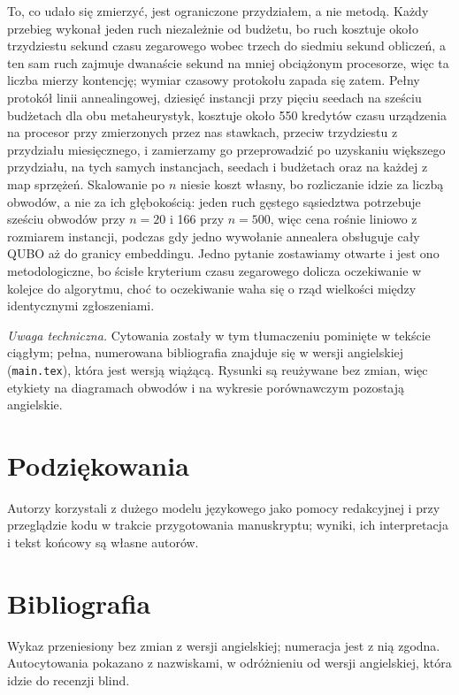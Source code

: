 \documentclass[11pt,a4paper]{article}
\begin{document}
To, co udało się zmierzyć, jest ograniczone przydziałem, a nie metodą. Każdy
przebieg wykonał jeden ruch niezależnie od budżetu, bo ruch kosztuje około
trzydziestu sekund czasu zegarowego wobec trzech do siedmiu sekund obliczeń,
a ten sam ruch zajmuje dwanaście sekund na mniej obciążonym procesorze, więc
ta liczba mierzy kontencję; wymiar czasowy protokołu zapada się zatem. Pełny
protokół linii annealingowej, dziesięć instancji przy pięciu seedach na sześciu
budżetach dla obu metaheurystyk, kosztuje około 550 kredytów czasu urządzenia
na procesor przy zmierzonych przez nas stawkach, przeciw trzydziestu
z przydziału miesięcznego, i zamierzamy go przeprowadzić po uzyskaniu
większego przydziału, na tych samych instancjach, seedach i budżetach oraz na
każdej z map sprzężeń. Skalowanie po $n$ niesie koszt własny, bo rozliczanie
idzie za liczbą obwodów, a nie za ich głębokością: jeden ruch gęstego
sąsiedztwa potrzebuje sześciu obwodów przy $n=20$ i 166 przy $n=500$, więc
cena rośnie liniowo z rozmiarem instancji, podczas gdy jedno wywołanie
annealera obsługuje cały QUBO aż do granicy embeddingu. Jedno pytanie
zostawiamy otwarte i jest ono metodologiczne, bo ścisłe kryterium czasu
zegarowego dolicza oczekiwanie w kolejce do algorytmu, choć to oczekiwanie
waha się o rząd wielkości między identycznymi zgłoszeniami.

\bigskip
\noindent\footnotesize
\emph{Uwaga techniczna.} Cytowania zostały w tym tłumaczeniu pominięte
w tekście ciągłym; pełna, numerowana bibliografia znajduje się w wersji
angielskiej (\texttt{main.tex}), która jest wersją wiążącą. Rysunki są
reużywane bez zmian, więc etykiety na diagramach obwodów i na wykresie
porównawczym pozostają angielskie.


\section*{Podziękowania}
\noindent Autorzy korzystali z dużego modelu językowego jako pomocy
redakcyjnej i przy przeglądzie kodu w trakcie przygotowania manuskryptu;
wyniki, ich interpretacja i tekst końcowy są własne autorów.

\normalsize
\section*{Bibliografia}
\noindent\footnotesize Wykaz przeniesiony bez zmian z wersji angielskiej;
numeracja jest z nią zgodna. Autocytowania pokazano z nazwiskami,
w odróżnieniu od wersji angielskiej, która idzie do recenzji blind.
\normalsize
\end{document}
